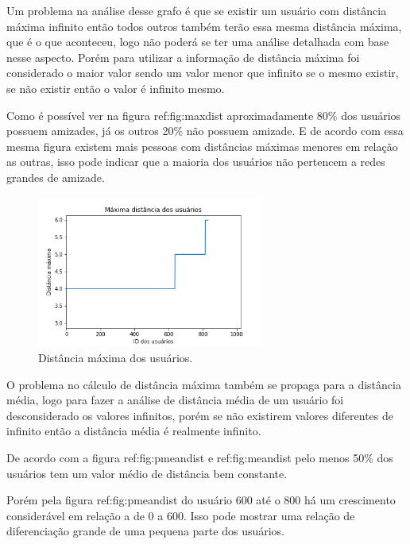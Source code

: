 \documentclass[11pt]{article}
\begin{document}
Um problema na análise desse grafo é que se existir um usuário com distância máxima infinito então todos outros também terão essa mesma distância máxima, que é o que aconteceu, logo não poderá se ter uma análise detalhada com base nesse aspecto. Porém para utilizar a informação de distância máxima foi considerado o maior valor sendo um valor menor que infinito se o mesmo existir, se não existir então o valor é infinito mesmo.

Como é possível ver na figura ref:fig:maxdist aproximadamente 80\% dos usuários possuem amizades, já os outros 20\% não possuem amizade. E de acordo com essa mesma figura existem mais pessoas com distâncias máximas menores em relação as outras, isso pode indicar que a maioria dos usuários não pertencem a redes grandes de amizade.

\begin{center}
\begin{figure}
\centering
\includegraphics[width=7.5cm]{maxdist}
\caption{Distância máxima dos usuários.}\label{fig:maxdist}
\end{figure}
\end{center}

O problema no cálculo de distância máxima também se propaga para a distância média, logo para fazer a análise de distância média de um usuário foi desconsiderado os valores infinitos, porém se não existirem valores diferentes de infinito então a distância média é realmente infinito.

De acordo com a figura ref:fig:pmeandist e ref:fig:meandist pelo menos 50\% dos usuários tem um valor médio de distância bem constante.

Porém pela figura ref:fig:pmeandist do usuário 600 até o 800 há um crescimento considerável em relação a de 0 a 600. Isso pode mostrar uma relação de diferenciação grande de uma pequena parte dos usuários.
\end{document}
